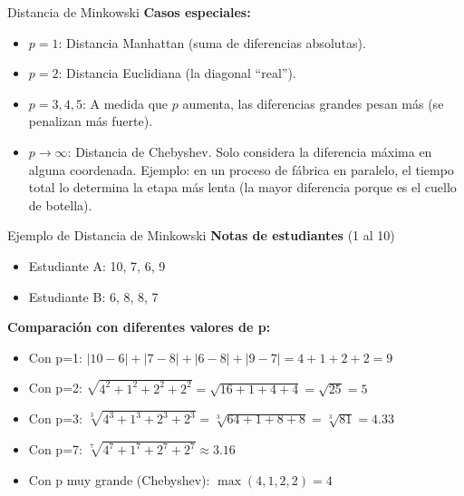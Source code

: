\documentclass{beamer}
\begin{document}
\begin{frame}{Distancia de Minkowski}
    \textbf{Casos especiales:}
    \begin{itemize}
        \item $p=1$: Distancia Manhattan (suma de diferencias absolutas).
        \item $p=2$: Distancia Euclidiana (la diagonal ``real'').
        \item $p=3,4,5$: A medida que $p$ aumenta, las diferencias grandes pesan más (se penalizan más fuerte).
        \item $p \to \infty$: Distancia de Chebyshev. Solo considera la diferencia máxima en alguna coordenada. 
        Ejemplo: en un proceso de fábrica en paralelo, el tiempo total lo determina la etapa más lenta (la mayor diferencia porque es el cuello de botella).
\end{itemize}
\end{frame}

\begin{frame}{Ejemplo de Distancia de Minkowski}
    \textbf{Notas de estudiantes} (1 al 10)
    \begin{itemize}
        \item Estudiante A: 10, 7, 6, 9
        \item Estudiante B: 6, 8, 8, 7
    \end{itemize}

    \textbf{Comparación con diferentes valores de p:}
    \begin{itemize}
        \item Con p=1: $|10-6| + |7-8| + |6-8| + |9-7| = 4 + 1 + 2 + 2 = 9$
        \item Con p=2: $\sqrt{4^2 + 1^2 + 2^2 + 2^2} = \sqrt{16 + 1 + 4 + 4} = \sqrt{25} = 5$
        \item Con p=3: $\sqrt[3]{4^3 + 1^3 + 2^3 + 2^3} = \sqrt[3]{64 + 1 + 8 + 8} = \sqrt[3]{81} = 4.33$
        \item Con p=7: $\sqrt[7]{4^{7} + 1^{7} + 2^{7} + 2^{7}} \approx 3.16$
        \item Con p muy grande (Chebyshev): $\max(4, 1, 2, 2) = 4$
    \end{itemize}
\end{frame}
\end{document}

